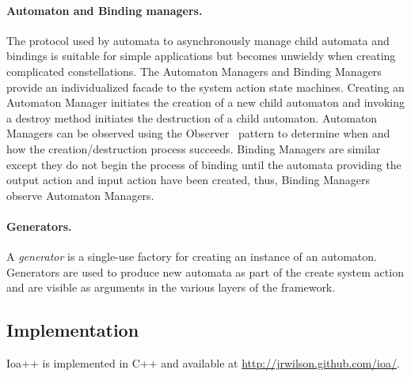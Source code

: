 \paragraph{Automaton and Binding managers.}
The protocol used by automata to asynchronously manage child automata and bindings is suitable for simple applications but becomes unwieldy when creating complicated constellations.
The Automaton Managers and Binding Managers provide an individualized facade to the system action state machines.
Creating an Automaton Manager initiates the creation of a new child automaton and invoking a destroy method initiates the destruction of a child automaton.
Automaton Managers can be observed using the Observer~\cite{gamma1995design} pattern to determine when and how the creation/destruction process succeeds.
Binding Managers are similar except they do not begin the process of binding until the automata providing the output action and input action have been created, thus, Binding Managers observe Automaton Managers.

\paragraph{Generators.}
A \emph{generator} is a single-use factory for creating an instance of an automaton.
Generators are used to produce new automata as part of the create system action and are visible as arguments in the various layers of the framework.

\subsection{Implementation}

Ioa++ is implemented in C++ and available at \url{http://jrwilson.github.com/ioa/}.

